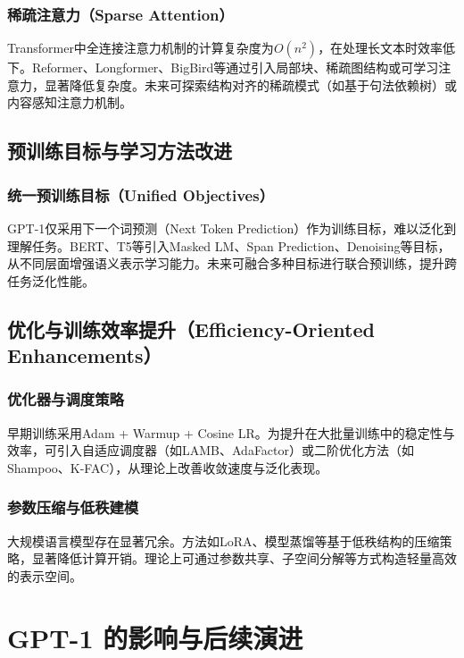 \documentclass[a4paper,12pt]{article}
\begin{document}
\subsubsection{稀疏注意力（Sparse Attention）}

Transformer中全连接注意力机制的计算复杂度为$O(n^2)$，在处理长文本时效率低下。Reformer、Longformer、BigBird等通过引入局部块、稀疏图结构或可学习注意力，显著降低复杂度。未来可探索结构对齐的稀疏模式（如基于句法依赖树）或内容感知注意力机制。

\subsection{预训练目标与学习方法改进}

\subsubsection{统一预训练目标（Unified Objectives）}

GPT-1仅采用下一个词预测（Next Token Prediction）作为训练目标，难以泛化到理解任务。BERT、T5等引入Masked LM、Span Prediction、Denoising等目标，从不同层面增强语义表示学习能力。未来可融合多种目标进行联合预训练，提升跨任务泛化性能。

\subsection{优化与训练效率提升（Efficiency-Oriented Enhancements）}

\subsubsection{优化器与调度策略}

早期训练采用Adam + Warmup + Cosine LR。为提升在大批量训练中的稳定性与效率，可引入自适应调度器（如LAMB、AdaFactor）或二阶优化方法（如Shampoo、K-FAC），从理论上改善收敛速度与泛化表现。

\subsubsection{参数压缩与低秩建模}

大规模语言模型存在显著冗余。方法如LoRA、模型蒸馏等基于低秩结构的压缩策略，显著降低计算开销。理论上可通过参数共享、子空间分解等方式构造轻量高效的表示空间。

\section{GPT-1 的影响与后续演进}
\end{document}
